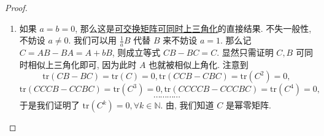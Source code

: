\documentclass[../../main.tex]{subfiles}%
\begin{document}
\begin{proof}
\begin{enumerate}
$\mathbf{Step}\,\,\mathbf{1}$ 若 \( \mathrm{Ker} A \subset \mathrm{Ker}(AB - BA) \), 则设 \( x \in \mathrm{Ker} A \), 我们有 \( ABx = BAx = 0 \), 这就证明了 \( \mathrm{Ker} A \) 是 \( B \) 不变子空间.

$\mathbf{Step}\,\,\mathbf{2}$ 若 \( \mathrm{Ker} A \not\subset \mathrm{Ker}(AB - BA) \) 成立, 取 \( x \in \mathrm{Ker} A \) 使得 \( y = (AB - BA)x \neq 0 \). 注意到 \( \mathrm{rank}(AB - BA) = 1 \), 故 \( \mathrm{Im}(AB - BA) = \mathrm{span}\{y\} \). 但是
\[
y = (AB - BA)x = ABx - BAx = ABx \in \mathrm{Im} A,
\]
这就说明 \( \mathrm{Im}(AB - BA) \subset \mathrm{Im} A \). 于是对 \( u = Av \in \mathrm{Im} A \), 我们有
\[
Bu = BAv = ABv - (AB - BA)v \in \mathrm{Im} A,
\]
从而确实了 \( \mathrm{Im} A \) 是 \( B \) 不变子空间.

注意到 \( A, B \) 有一个公共非平凡不变子空间. 所以取这个不变子空间一组基扩充为全空间的基, 则 \( A, B \) 有表示矩阵
\[
\widetilde{A} = \begin{pmatrix} A_1 & A_3 \\ 0 & A_2 \end{pmatrix}, \widetilde{B} = \begin{pmatrix} B_1 & B_3 \\ 0 & B_2 \end{pmatrix}.
\]
注意到
\begin{align*}
r(AB - BA) &= r\begin{pmatrix} A_1B_1 - B_1A_1 & * \\ 0 & A_2B_2 - B_2A_2 \end{pmatrix}
\\
&\stackrel{\text{\hyperref[矩阵秩的基本公式3]{矩阵秩的基本公式(3)}}}{\geqslant} r\begin{pmatrix} A_1B_1 - B_1A_1 & 0 \\ 0 & A_2B_2 - B_2A_2 \end{pmatrix} 
\\
&= r(A_1B_1 - B_1A_1) + r(A_2B_2 - B_2A_2),
\end{align*}
我们有
\[
r(A_1B_1 - B_1A_1) \leqslant 1, r(A_2B_2 - B_2A_2) \leqslant 1,
\]
现在阶降下去了, 类似我们前面的归纳证明我们知道 \( A, B \) 可同时相似上三角化.

\item 如果 \( a = b = 0 \), 那么这是\hyperref[proposition:一族两两可交换的一般域上的矩阵可同时上三角化]{可交换矩阵可同时上三角化}的直接结果. 不失一般性, 不妨设 \( a \neq 0 \). 我们可以用 \( \frac{1}{a}B \) 代替 \( B \) 来不妨设 \( a = 1 \). 那么记 \( C = AB - BA = A + bB \), 则成立等式 \( CB - BC = C \). 显然只需证明 \( C, B \) 可同时相似上三角化即可, 因为此时 \( A \) 也就被相似上角化. 注意到
\[
\mathrm{tr}(CB - BC) = \mathrm{tr}(C) = 0, \mathrm{tr}(CCB - CBC) = \mathrm{tr}(C^2) = 0,
\]
\[
\mathrm{tr}(CCCB - CCBC) = \mathrm{tr}(C^3) = 0, \mathrm{tr}(CCCCB - CCCBC) = \mathrm{tr}(C^4) = 0,
\]
\[
\cdots\cdots\cdots\cdots
\]
于是我们证明了 \( \mathrm{tr}(C^k) = 0, \forall k \in \mathbb{N} \). 由, 我们知道 \( C \) 是幂零矩阵.


\end{enumerate}
\end{proof}
\end{document}
